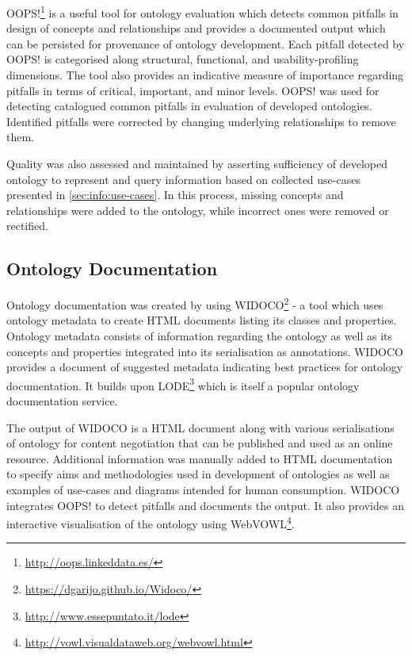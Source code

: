 OOPS!\footnote{\url{http://oops.linkeddata.es/}} \cite{poveda-villalon_oops!_2014} is a useful tool for ontology evaluation which detects common pitfalls in design of concepts and relationships and provides a documented output which can be persisted for provenance of ontology development. Each pitfall detected by OOPS! is categorised along structural, functional, and usability-profiling dimensions. The tool also provides an indicative measure of importance regarding pitfalls in terms of critical, important, and minor levels.
OOPS! was used for detecting catalogued common pitfalls in evaluation of developed ontologies. Identified pitfalls were corrected by changing underlying relationships to remove them. 

Quality was also assessed and maintained by asserting sufficiency of developed ontology to represent and query information based on collected use-cases presented in \autoref{sec:info:use-cases}. In this process, missing concepts and relationships were added to the ontology, while incorrect ones were removed or rectified.

\subsection{Ontology Documentation}
Ontology documentation was created by using WIDOCO\footnote{\url{https://dgarijo.github.io/Widoco/}} \cite{garijo_widoco_2017} - a tool which uses ontology metadata to create HTML documents listing its classes and properties. Ontology metadata consists of information regarding the ontology as well as its concepts and properties integrated into its serialisation as annotations. WIDOCO provides a document of suggested metadata indicating best practices for ontology documentation. It builds upon LODE\footnote{\url{http://www.essepuntato.it/lode}} which is itself a popular ontology documentation service.

The output of WIDOCO is a HTML document along with various serialisations of ontology for content negotiation that can be published and used as an online resource. Additional information was manually added to HTML documentation to specify aims and methodologies used in development of ontologies as well as examples of use-cases and diagrams intended for human consumption. WIDOCO integrates OOPS! to detect pitfalls and documents the output. It also provides an interactive visualisation of the ontology using WebVOWL\footnote{\url{http://vowl.visualdataweb.org/webvowl.html}}.


